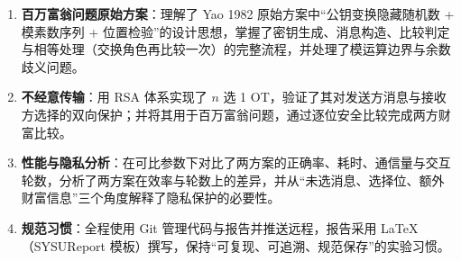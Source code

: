 \documentclass{SYSUReport}
\begin{document}
\begin{enumerate}
    \item \textbf{百万富翁问题原始方案}：理解了 Yao 1982 原始方案中“公钥变换隐藏随机数 + 模素数序列 + 位置检验”的设计思想，掌握了密钥生成、消息构造、比较判定与相等处理（交换角色再比较一次）的完整流程，并处理了模运算边界与余数歧义问题。
    \item \textbf{不经意传输}：用 RSA 体系实现了 $n$ 选 1 OT，验证了其对发送方消息与接收方选择的双向保护；并将其用于百万富翁问题，通过逐位安全比较完成两方财富比较。
    \item \textbf{性能与隐私分析}：在可比参数下对比了两方案的正确率、耗时、通信量与交互轮数，分析了两方案在效率与轮数上的差异，并从“未选消息、选择位、额外财富信息”三个角度解释了隐私保护的必要性。
    \item \textbf{规范习惯}：全程使用 Git 管理代码与报告并推送远程，报告采用 LaTeX（SYSUReport 模板）撰写，保持“可复现、可追溯、规范保存”的实验习惯。
\end{enumerate}
\end{document}
